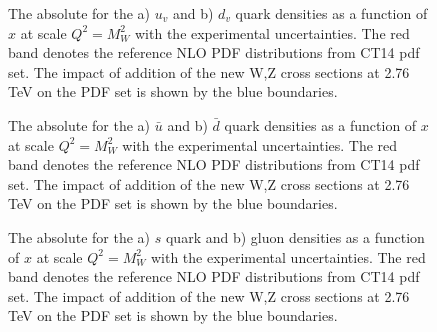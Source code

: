 \begin{figure}[!h]
\begin{minipage}[h]{0.49\linewidth}
\end{minipage}
\hfill
\begin{minipage}[h]{0.49\linewidth}
\end{minipage}
\caption{The absolute for the a) $u_v$ and b) $d_v$ quark densities as a function of $x$ at scale $Q^2=M_W^2$ with the experimental uncertainties. The red band denotes the reference NLO PDF distributions from CT14 pdf set. The impact of addition of the new W,Z cross sections at 2.76 TeV on the PDF set is shown by the blue boundaries.}
\label{fig:AppC3}
\end{figure}

\begin{figure}[!h]
\begin{minipage}[h]{0.49\linewidth}
\end{minipage}
\hfill
\begin{minipage}[h]{0.49\linewidth}
\end{minipage}
\caption{The absolute for the a) $\bar{u}$ and b) $\bar{d}$ quark densities as a function of $x$ at scale $Q^2=M_W^2$ with the experimental uncertainties. The red band denotes the reference NLO PDF distributions from CT14 pdf set. The impact of addition of the new W,Z cross sections at 2.76 TeV on the PDF set is shown by the blue boundaries.}
\end{figure}

\begin{figure}[!h]
\begin{minipage}[h]{0.49\linewidth}
\end{minipage}
\hfill
\begin{minipage}[h]{0.49\linewidth}
\end{minipage}
\caption{The absolute for the a) $s$ quark and b) gluon densities as a function of $x$ at scale $Q^2=M_W^2$ with the experimental uncertainties. The red band denotes the reference NLO PDF distributions from CT14 pdf set. The impact of addition of the new W,Z cross sections at 2.76 TeV on the PDF set is shown by the blue boundaries.}
\label{fig:AppC4}
\end{figure}
